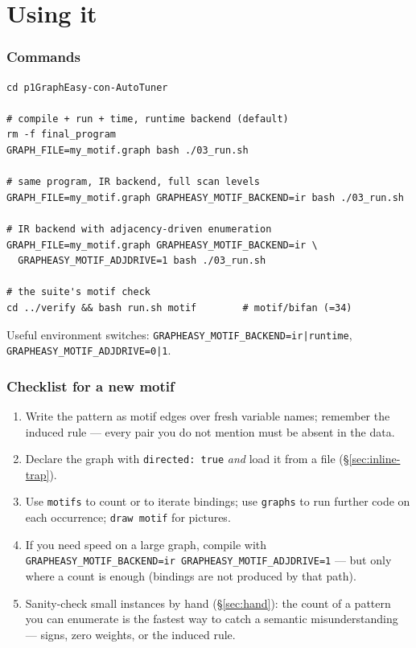 \documentclass[11pt,a4paper]{article}
\newcommand{\code}[1]{\texttt{#1}}
\begin{document}
\part{Using it}

\section{Commands}

\begin{lstlisting}[style=plain]
cd p1GraphEasy-con-AutoTuner

# compile + run + time, runtime backend (default)
rm -f final_program
GRAPH_FILE=my_motif.graph bash ./03_run.sh

# same program, IR backend, full scan levels
GRAPH_FILE=my_motif.graph GRAPHEASY_MOTIF_BACKEND=ir bash ./03_run.sh

# IR backend with adjacency-driven enumeration
GRAPH_FILE=my_motif.graph GRAPHEASY_MOTIF_BACKEND=ir \
  GRAPHEASY_MOTIF_ADJDRIVE=1 bash ./03_run.sh

# the suite's motif check
cd ../verify && bash run.sh motif        # motif/bifan (=34)
\end{lstlisting}

Useful environment switches: \code{GRAPHEASY\_MOTIF\_BACKEND=ir|runtime},
\code{GRAPHEASY\_MOTIF\_ADJDRIVE=0|1}.

\section{Checklist for a new motif}

\begin{enumerate}
  \item Write the pattern as motif edges over fresh variable names; remember the
        induced rule --- every pair you do not mention must be absent in the
        data.
  \item Declare the graph with \code{directed: true} \emph{and} load it from a
        file (\S\ref{sec:inline-trap}).
  \item Use \code{motifs} to count or to iterate bindings; use \code{graphs} to
        run further code on each occurrence; \code{draw motif} for pictures.
  \item If you need speed on a large graph, compile with
        \code{GRAPHEASY\_MOTIF\_BACKEND=ir GRAPHEASY\_MOTIF\_ADJDRIVE=1} --- but
        only where a count is enough (bindings are not produced by that path).
  \item Sanity-check small instances by hand (\S\ref{sec:hand}): the count of a
        pattern you can enumerate is the fastest way to catch a semantic
        misunderstanding --- signs, zero weights, or the induced rule.
\end{enumerate}
\end{document}
